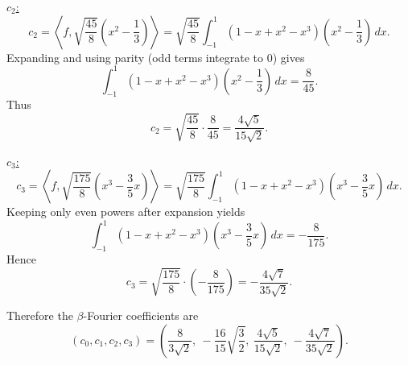 \documentclass[12pt]{article}
\newcommand{\ip}[2]{\left\langle #1,#2\right\rangle}
\begin{document}
\begin{enumerate}[label=(\alph*)]
\underline{$c_2$:}
\[
c_2=\ip{f}{\sqrt{\frac{45}{8}}\left(x^2-\frac13\right)}
=\sqrt{\frac{45}{8}}\int_{-1}^1 (1-x+x^2-x^3)\left(x^2-\frac13\right)\,dx.
\]
Expanding and using parity (odd terms integrate to $0$) gives
\[
\int_{-1}^1 (1-x+x^2-x^3)\left(x^2-\frac13\right)\,dx
=\frac{8}{45}.
\]
Thus
\[
c_2=\sqrt{\frac{45}{8}}\cdot \frac{8}{45}=\frac{4\sqrt5}{15\sqrt2}.
\]

\underline{$c_3$:}
\[
c_3=\ip{f}{\sqrt{\frac{175}{8}}\left(x^3-\frac35 x\right)}
=\sqrt{\frac{175}{8}}\int_{-1}^1 (1-x+x^2-x^3)\left(x^3-\frac35 x\right)\,dx.
\]
Keeping only even powers after expansion yields
\[
\int_{-1}^1 (1-x+x^2-x^3)\left(x^3-\frac35 x\right)\,dx
=-\frac{8}{175}.
\]
Hence
\[
c_3=\sqrt{\frac{175}{8}}\cdot\left(-\frac{8}{175}\right)=-\frac{4\sqrt7}{35\sqrt2}.
\]

Therefore the $\beta$-Fourier coefficients are
\[
\boxed{\,
(c_0,c_1,c_2,c_3)=\left(\frac{8}{3\sqrt2},\ -\frac{16}{15}\sqrt{\frac32},\ \frac{4\sqrt5}{15\sqrt2},\ -\frac{4\sqrt7}{35\sqrt2}\right).
\,}
\]
\end{enumerate}


\newpage
\end{document}
